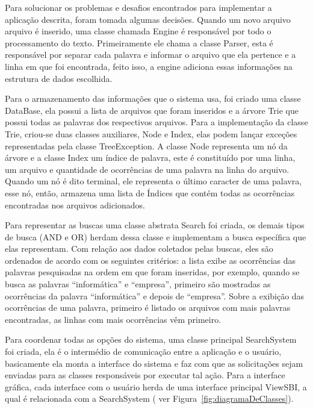 \documentclass[12pt]{article}
\begin{document}
 Para solucionar os problemas e desafios encontrados para implementar a aplicação descrita, foram tomada algumas decisões. Quando um novo arquivo arquivo é inserido, uma classe chamada Engine é responsável por todo o processamento do texto. Primeiramente ele chama a classe Parser, esta é responsável por separar cada palavra e informar o arquivo que ela pertence e a linha em que foi encontrada, feito isso, a engine adiciona essas informações na estrutura de dados  escolhida.
 
	Para o armazenamento das informações que o sistema usa, foi criado uma classe DataBase, ela possui a lista de arquivos que foram inseridos e a árvore Trie que possui  todas as palavras dos respectivos arquivos. Para a implementação da classe Trie, criou-se duas classes auxiliares, Node e Index, elas podem lançar exceções representadas pela classe TreeException. A classe Node representa um nó da árvore e a classe Index um índice de palavra, este é constituído por uma linha, um arquivo e quantidade de ocorrências de uma palavra na linha do arquivo. Quando um nó é dito terminal, ele representa o último caracter de uma palavra, esse nó, então, armazena uma lista de Índices que contém todas as ocorrências encontradas nos arquivos adicionados.
	
	Para representar as buscas uma classe abstrata Search foi criada, os demais tipos de busca (AND e OR) herdam dessa classe e implementam a busca específica que elas representam. Com relação aos dados coletados pelas buscas, eles são ordenados de acordo com os seguintes critérios: a lista exibe as ocorrências das palavras pesquisadas na ordem em que foram inseridas, por exemplo, quando se busca as palavras “informática” e “empresa”, primeiro são mostradas as ocorrências da palavra “informática” e depois de “empresa”. Sobre a exibição das ocorrências de uma palavra, primeiro é listado os arquivos com mais palavras encontradas, as linhas com mais ocorrências vêm primeiro.
	
	Para coordenar todas as opções do sistema, uma classe principal SearchSystem foi criada, ela é o intermédio de comunicação entre a aplicação e o usuário, basicamente ela monta a interface do sistema e faz com que as solicitações sejam enviadas para as classes responsáveis por executar tal ação. Para a interface gráfica, cada interface com o usuário herda de uma interface principal ViewSBI, a qual é relacionada com a SearchSystem ( ver Figura~\ref{fig:diagramaDeClasses}).
\end{document}
